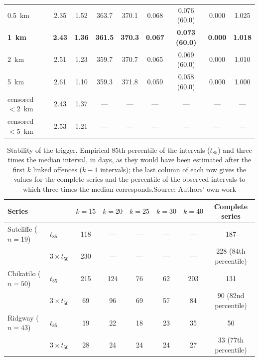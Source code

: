 \documentclass[11pt,a4paper]{article}
\begin{document}
\begin{table}[htbp]
\begin{tabular}{lcccccccc}
0.5~km & 2.35 & 1.52 & 363.7 & 370.1 & 0.068 & 0.076 (60.0) & 0.000 & 1.025\\
\textbf{1~km} & \textbf{2.43} & \textbf{1.36} & \textbf{361.5} & \textbf{370.3} & \textbf{0.067} & \textbf{0.073 (60.0)} & \textbf{0.000} & \textbf{1.018}\\
2~km & 2.51 & 1.23 & 359.7 & 370.7 & 0.065 & 0.069 (60.0) & 0.000 & 1.010\\
5~km & 2.61 & 1.10 & 359.3 & 371.8 & 0.059 & 0.058 (60.0) & 0.000 & 1.000\\
censored $<2$~km & 2.43 & 1.37 & --- & --- & --- & --- & --- & ---\\
censored $<5$~km & 2.53 & 1.21 & --- & --- & --- & --- & --- & ---\\
\bottomrule
\end{tabular}
\end{table}

\begin{table}[htbp]
\centering\small
\caption{Stability of the trigger. Empirical 85th percentile of the intervals ($t_{85}$) and three times the median interval, in days, as they would have been estimated after the first $k$ linked offences ($k-1$ intervals); the last column of each row gives the values for the complete series and the percentile of the observed intervals to which three times the median corresponds.\newline Source: Authors' own work}
\begin{tabular}{llcccccc}
\toprule
Series & & $k=15$ & $k=20$ & $k=25$ & $k=30$ & $k=40$ & Complete series\\
\midrule
Sutcliffe ($n=19$) & $t_{85}$ & 118 & --- & --- & --- & --- & 187\\
 & $3\times t_{50}$ & 230 & --- & --- & --- & --- & 228 (84th percentile)\\
Chikatilo ($n=50$) & $t_{85}$ & 215 & 124 & 76 & 62 & 203 & 131\\
 & $3\times t_{50}$ & 69 & 96 & 69 & 57 & 84 & 90 (82nd percentile)\\
Ridgway ($n=43$) & $t_{85}$ & 19 & 22 & 18 & 23 & 35 & 50\\
 & $3\times t_{50}$ & 28 & 24 & 24 & 24 & 27 & 33 (77th percentile)\\
\bottomrule
\end{tabular}
\end{table}


\clearpage
\end{document}
